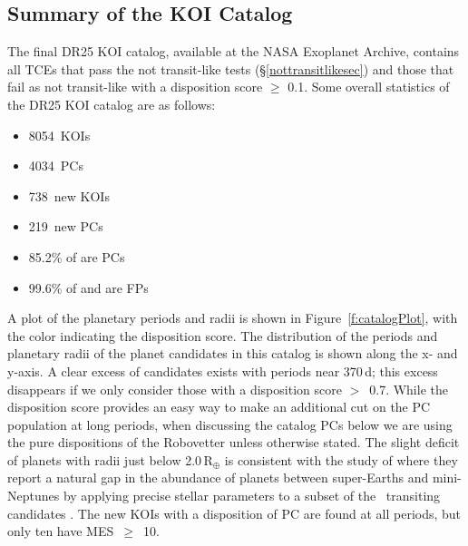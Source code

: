\def \nkois {8054}
\def \ncand {4034}
\def \newkois {738}
\def \newcand {219}
\def \completeness {85.2}
\def \reliability {97.1}
\def \effectiveness {99.6}
\label{s:summary}
\vspace{-0.1em}
\subsection{Summary of the KOI Catalog}
The final DR25 KOI catalog, available at the NASA Exoplanet Archive, contains all TCEs that pass the not transit-like tests (\S\ref{nottransitlikesec}) and those that fail as not transit-like with a disposition score $\ge$ 0.1. Some overall statistics of the DR25 KOI catalog are as follows:
\vspace{-0.9em}
\begin{itemize}
\itemsep0em
    \item \nkois{}~KOIs
    \item \ncand{}~PCs
    \item \newkois{}~new KOIs
    \item \newcand{}~new PCs
    \item \completeness{}\% of  are PCs
    \item \effectiveness{}\% of  and  are FPs
\end{itemize}

A plot of the planetary periods and radii is shown in Figure~\ref{f:catalogPlot}, with the color indicating the disposition score. The distribution of the periods and planetary radii of the planet candidates in this catalog is shown along the x- and y-axis. A clear excess of candidates exists with periods near 370\,d;  this excess disappears if we only consider those with a disposition score $>$~0.7. While the disposition score provides an easy way to make an additional cut on the PC population at long periods, when discussing the catalog PCs below we are using the pure dispositions of the Robovetter unless otherwise stated. The slight deficit of planets with radii just below 2.0\,R$_{\oplus}$ is consistent with the study of \citet{Fulton2017} where they report a natural gap in the abundance of planets between super-Earths and mini-Neptunes by applying precise stellar parameters to a subset of the \kepler\ transiting candidates \citep{CKS2,CKS1}. The new KOIs with a disposition of PC are found at all periods, but only ten have MES~$\geq$~10.

